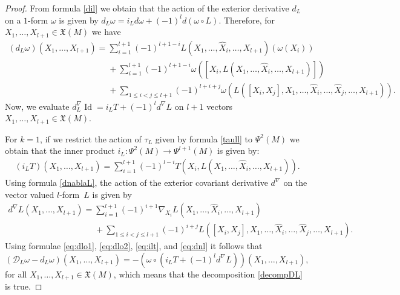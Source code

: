 \documentclass[pdftex]{sigma}
\numberwithin{equation}{section}
\begin{document}
\begin{proof}
From formula \eqref{dil} we obtain that the action of the exterior
derivative $d_L$ on a $1$-form $\omega$ is given by
$d_L\omega=i_Ld\omega+ (-1)^ld(\omega\circ L)$.
Therefore, for $X_1, \dots , X_{l+1} \in {\mathfrak X}(M)$ we have{\samepage
\begin{gather}
\nonumber (d_L\omega)(X_1,\dots ,X_{l+1})   =   \sum_{i=1}^{l+1}(-1)^{l+1-i}
L(X_1,\dots , \hat{X}_i,\dots , X_{l+1})(\omega(X_i))  \\
\label{eq:dlo2}
\phantom{(d_L\omega)(X_1,\dots ,X_{l+1})   =}{}
+\sum_{i=1}^{l+1}(-1)^{l+1-i} \omega([X_i, L(X_1,\dots ,
\hat{X}_i,\dots , X_{l+1})])  \\
\nonumber   \phantom{(d_L\omega)(X_1,\dots ,X_{l+1})   =}{}
 +\sum_{1\leq i<j\leq l+1}
(-1)^{l+i+j}\omega(L([X_i,X_j], X_1,\dots , \hat{X}_i,\dots ,
\hat{X}_j,\dots , X_{l+1})).
\end{gather}
Now, we evaluate $d^{\nabla}_L\operatorname{Id}=i_LT + (-1)^l
d^{\nabla}L$ on $l+1$ vectors $X_1, \dots , X_{l+1} \in {\mathfrak
X}(M)$.}

For $k=1$, if we restrict the action of $\tau_L$ given by formula
\eqref{taull} to $\Psi^2(M)$ we obtain that the inner product $i_L: \Psi^2(M) \to
\Psi^{l+1}(M)$ is given by:
\begin{gather}
\left(i_LT\right)(X_1,\dots ,
X_{l+1})=\sum_{i=1}^{l+1}(-1)^{l-i}T(X_i, L(X_1,\dots , \hat{X}_i,
\dots , X_{l+1})). \label{eq:ilt}
\end{gather} Using formula \eqref{dnablaL}, the action of the exterior covariant derivative
$d^{\nabla}$ on the vector valued
$l$-form~$L$ is given by
\begin{gather}
\nonumber   d^{\nabla}L(X_1,\dots , X_{l+1}) = \sum_{i=1}^{l+1}
(-1)^{i+1}\nabla_{X_i}L(X_1,\dots , \hat{X}_i, \dots , X_{l+1})  \\
\phantom{d^{\nabla}L(X_1,\dots , X_{l+1}) =}{}
 + \sum_{1\leq i<j\leq l+1} (-1)^{i+j}L([X_i, X_j], X_1,\dots ,
\hat{X}_i,\dots , \hat{X}_j,\dots , X_{l+1}). \label{eq:dnl}
\end{gather}
Using formulae \eqref{eq:dlo1}, \eqref{eq:dlo2}, \eqref{eq:ilt}, and \eqref{eq:dnl} it follows that
\[
\left({\mathcal D}_L \omega-d_L\omega\right)(X_1,\dots ,X_{l+1}) =
-\left(\omega\circ (i_LT+(-1)^ld^{\nabla}L)\right)(X_1,\dots ,X_{l+1}),
\]
for all $X_1,\dots , X_{l+1}\in  {\mathfrak X}(M)$, which means that the decomposition \eqref{decompDL} is true.
\end{proof}
\end{document}
